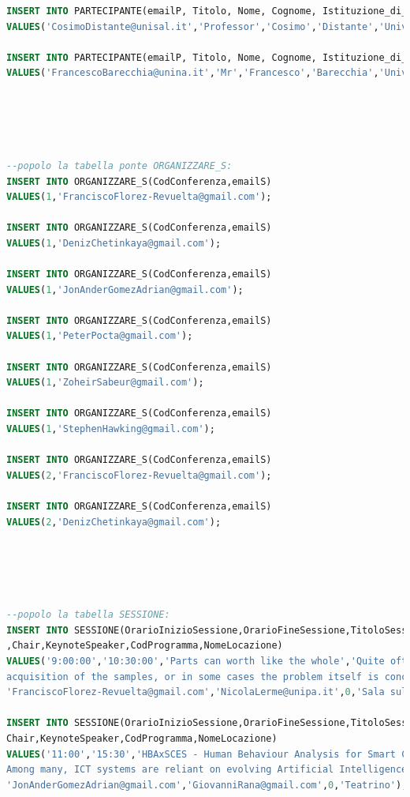 \documentclass[a4page]{article}
\begin{document}
\begin{lstlisting}[language=SQL,
        deletekeywords={IDENTITY,INT},
        morekeywords={clustered},    
        framesep=10pt,
        framextopmargin=10pt]
INSERT INTO PARTECIPANTE(emailP, Titolo, Nome, Cognome, Istituzione_di_Afferenza)
VALUES('CosimoDistante@unisal.it','Professor','Cosimo','Distante','Universita del Salento');

INSERT INTO PARTECIPANTE(emailP, Titolo, Nome, Cognome, Istituzione_di_Afferenza)
VALUES('FrancescoBarecchia@unina.it','Mr','Francesco','Barecchia','Universita degli Studi di Napoli Federico II');





--popolo la tabella ponte ORGANIZZARE_S:
INSERT INTO ORGANIZZARE_S(CodConferenza,emailS)
VALUES(1,'FranciscoFlorez-Revuelta@gmail.com');

INSERT INTO ORGANIZZARE_S(CodConferenza,emailS)
VALUES(1,'DenizChetinkaya@gmail.com');

INSERT INTO ORGANIZZARE_S(CodConferenza,emailS)
VALUES(1,'JonAnderGomezAdrian@gmail.com');

INSERT INTO ORGANIZZARE_S(CodConferenza,emailS)
VALUES(1,'PeterPocta@gmail.com');

INSERT INTO ORGANIZZARE_S(CodConferenza,emailS)
VALUES(1,'ZoheirSabeur@gmail.com');

INSERT INTO ORGANIZZARE_S(CodConferenza,emailS)
VALUES(1,'StephenHawking@gmail.com');

INSERT INTO ORGANIZZARE_S(CodConferenza,emailS)
VALUES(2,'FranciscoFlorez-Revuelta@gmail.com');

INSERT INTO ORGANIZZARE_S(CodConferenza,emailS)
VALUES(2,'DenizChetinkaya@gmail.com');





--popolo la tabella SESSIONE:
INSERT INTO SESSIONE(OrarioInizioSessione,OrarioFineSessione,TitoloSessione,DescrizioneSessione
,Chair,KeynoteSpeaker,CodProgramma,NomeLocazione)
VALUES('9:00:00','10:30:00','Parts can worth like the whole','Quite often the useful data for an analysis task are not available in an optimal condition. This may be due to the occlusions or the noise affecting the 
acquisition of the samples, or in some cases the problem itself is conceived in a way that a solution comes from the analysis of smaller portions of the input.', 
'FranciscoFlorez-Revuelta@gmail.com','NicolaLerme@unipa.it',0,'Sala sul Chiostro del 500 (First floor)');
	   
INSERT INTO SESSIONE(OrarioInizioSessione,OrarioFineSessione,TitoloSessione,DescrizioneSessione,
Chair,KeynoteSpeaker,CodProgramma,NomeLocazione)
VALUES('11:00','15:30','HBAxSCES - Human Behaviour Analysis for Smart City Environment Safety','Nowadays, Smart Cities aim to ensure secure and safe physical and digital environments for the well-being of citizens.
Among many, ICT systems are reliant on evolving Artificial Intelligence, Pattern Recognition, Computer Vision, 3D simulations and Digital Twins techniques to make the environments more resilient.',
'JonAnderGomezAdrian@gmail.com','GiovanniRana@gmail.com',0,'Teatrino');


\end{lstlisting}
\end{document}
